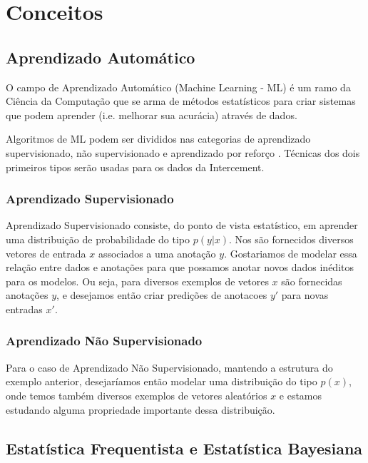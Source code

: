 \chapter{Conceitos}
\label{cap:conceitos}


\section{Aprendizado Automático}

O campo de Aprendizado Automático (Machine Learning - ML) é um ramo da Ciência da Computação que se arma de métodos estatísticos para criar sistemas que podem aprender (i.e. melhorar sua acurácia) através de dados.

Algoritmos de ML podem ser divididos nas categorias de aprendizado supervisionado, não supervisionado e aprendizado por reforço \citep{dlbook}. Técnicas dos dois primeiros tipos serão usadas para os dados da Intercement.

\subsection{Aprendizado Supervisionado}

Aprendizado Supervisionado consiste, do ponto de vista estatístico, em aprender uma distribuição
de probabilidade do tipo $p(y | x)$. Nos são fornecidos diversos vetores de
entrada $x$ associados a uma anotação $y$. Gostariamos de modelar essa relação
entre dados e anotações para que possamos anotar novos dados inéditos para os
modelos. Ou seja, para diversos exemplos de vetores
$x$ são fornecidas anotações $y$, e desejamos então criar predições de anotacoes
$y'$ para novas entradas $x'$.


\subsection{Aprendizado Não Supervisionado}

Para o caso de Aprendizado Não Supervisionado, mantendo a estrutura do exemplo
anterior, desejaríamos então modelar uma distribuição do tipo $p(x)$, onde temos
também diversos exemplos de vetores aleatórios $x$ e estamos estudando alguma propriedade importante dessa distribuição.

\section{Estatística Frequentista e Estatística Bayesiana}

